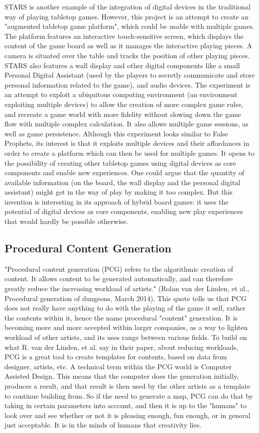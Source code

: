 STARS is another example of the integration of digital devices in the traditional way of playing tabletop games. However, this project is an attempt to create an "augmented tabletop game platform", which could be usable with multiple games. The platform features an interactive touch-sensitive screen, which displays the content of the game board as well as it manages the interactive playing pieces. A camera is situated over the table and tracks the position of other playing pieces. STARS also features a wall display and other digital components like a small Personal Digital Assistant (used by the players to secretly communicate and store personal information related to the game), and audio devices. The experiment is an attempt to exploit a ubiquitous computing environment (an environment exploiting multiple devices) to allow the creation of more complex game rules, and recreate a game world with more fidelity without slowing down the game flow with multiple complex calculation. It also allows multiple game sessions, as well as game persistence. Although this experiment looks similar to False Prophets, its interest is that it exploits multiple devices and their affordances in order to create a platform which can then be used for multiple games. It opens to the possibility of creating other tabletop games using digital devices as core components and enable new experiences. One could argue that the quantity of available information (on the board, the wall display and the personal digital assistant) might get in the way of play by making it too complex. But this invention is interesting in its approach of hybrid board games: it uses the potential of digital devices as core components, enabling new play experiences that would hardly be possible otherwise.
\subsection{Procedural Content Generation}
"Procedural content generation (PCG) refers to the algorithmic creation of content. It allows content to be generated automatically, and can therefore greatly reduce the increasing workload of artists." (Rolan van der Linden, et al., Procedural generation of dungeons, March 2014).
This quote tells us that PCG does not really have anything to do with the playing of the game it self, rather the contents within it, hence the name procedural "content" generation. It is becoming more and more accepted within larger companies, as a way to lighten workload of other artists, and its uses range between various fields.
To build on what R. van der Linden, et al. say in their paper, about reducing workloads, PCG is a great tool to create templates for contents, based on data from designer, artists, etc. A technical term within the PCG world is Computer Assisted Design. This means that the computer does the generation initially, produces a result, and that result is then used by the other artists as a template to continue building from. So if the need to generate a map, PCG can do that by taking in certain parameters into account, and then it is up to the "humans" to look over and see whether or not it is pleasing enough, fun enough, or in general just acceptable. It is in the minds of humans that creativity lies. \\


